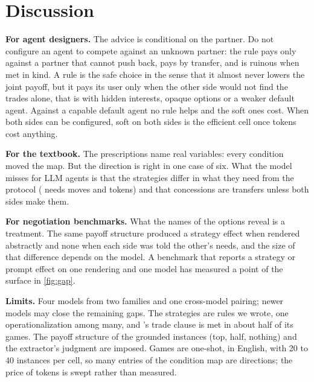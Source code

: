 \section{Discussion}
\label{sec:discussion}

\textbf{For agent designers.} The advice is conditional on the partner. Do not configure an agent to compete against an unknown partner: the rule pays only against a partner that cannot push back, pays by transfer, and is ruinous when met in kind. A \collaborating{} rule is the safe choice in the sense that it almost never lowers the joint payoff, but it pays its user only when the other side would not find the trades alone, that is with hidden interests, opaque options or a weaker default agent. Against a capable default agent no rule helps and the soft ones cost. When both sides can be configured, soft on both sides is the efficient cell once tokens cost anything.

\textbf{For the textbook.} The \tki{} prescriptions name real variables: every condition moved the map. But the direction is right in one case of six. What the model misses for LLM agents is that the strategies differ in what they need from the protocol (\collaborating{} needs moves and tokens) and that concessions are transfers unless both sides make them.

\textbf{For negotiation benchmarks.} What the names of the options reveal is a treatment. The same payoff structure produced a strategy effect when rendered abstractly and none when each side was told the other's needs, and the size of that difference depends on the model. A benchmark that reports a strategy or prompt effect on one rendering and one model has measured a point of the surface in \cref{fig:gap}.

\textbf{Limits.} Four models from two families and one cross-model pairing; newer models may close the remaining gaps. The strategies are rules we wrote, one operationalization among many, and \collaborating's trade clause is met in about half of its games. The payoff structure of the grounded instances (top, half, nothing) and the extractor's judgment are imposed. Games are one-shot, in English, with 20 to 40 instances per cell, so many entries of the condition map are directions; the price of tokens is swept rather than measured.

